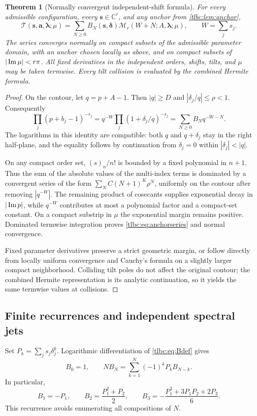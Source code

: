\documentclass[11pt,letterpaper]{article}
\numberwithin{equation}{section}
\newtheorem{theorem}{Theorem}[section]
\theoremstyle{definition}\newtheorem{definition}[theorem]{Definition}
\theoremstyle{remark}\newtheorem{remark}[theorem]{Remark}
\newcommand{\C}{\mathbb C}\newcommand{\R}{\mathbb R}\newcommand{\Q}{\mathbb Q}\newcommand{\Z}{\mathbb Z}
\newcommand{\M}{\mathcal M}\newcommand{\T}{\mathcal T}\newcommand{\K}{\mathcal K}
\newcommand{\bs}{\boldsymbol s}\newcommand{\ba}{\boldsymbol a}\newcommand{\bl}{\boldsymbol\lambda}
\newcommand{\bd}{\boldsymbol\delta}\newcommand{\bk}{\boldsymbol k}
\begin{document}
\begin{theorem}[Normally convergent independent-shift formula]\label{tlbc:thm:anchor}
For every admissible configuration, every $\bs\in\C^r$, and any anchor from \cref{tlbc:lem:anchor},
\begin{equation}\label{tlbc:eq:anchorseries}
 \boxed{\displaystyle
 \T(\bs,\ba,\bl;\mu)
 =\sum_{N\ge0}B_N(\bs,\bd)
       \M_r(W+N;A,\bl;\mu),\qquad W=\sum_js_j.}
\end{equation}
The series converges normally on compact subsets of the admissible parameter domain, with an anchor chosen locally as above, and on compact subsets of $|\operatorname{Im}\mu|<r\pi$. All fixed derivatives in the independent orders, shifts, tilts, and $\mu$ may be taken termwise. Every tilt collision is evaluated by the combined Hermite formula.
\end{theorem}
\begin{proof}
On the contour, let $q=p+A-1$. Then $|q|\ge D$ and
$|\delta_j/q|\le\rho<1$. Consequently
\[
 \prod_j(p+b_j-1)^{-s_j}
 =q^{-W}\prod_j(1+\delta_j/q)^{-s_j}
 =\sum_{N\ge0}B_Nq^{-W-N}.
\]
The logarithms in this identity are compatible: both $q$ and $q+\delta_j$ stay in the right half-plane, and the equality follows by continuation from $\delta_j=0$ within $|\delta_j|<|q|$.

On any compact order set, $(s)_n/n!$ is bounded by a fixed polynomial in $n+1$. Thus the sum of the absolute values of the multi-index terms is dominated by a convergent series of the form $\sum_N C(N+1)^K\rho^N$, uniformly on the contour after removing $|q^{-W}|$. The remaining product of cosecants supplies exponential decay in $|\operatorname{Im} p|$, while $q^{-W}$ contributes at most a polynomial factor and a compact-set constant. On a compact substrip in $\mu$ the exponential margin remains positive. Dominated termwise integration proves \eqref{tlbc:eq:anchorseries} and normal convergence.

Fixed parameter derivatives preserve a strict geometric margin, or follow directly from locally uniform convergence and Cauchy's formula on a slightly larger compact neighborhood. Colliding tilt poles do not affect the original contour; the combined Hermite representation is its analytic continuation, so it yields the same termwise values at collisions.
\end{proof}

\subsection{Finite recurrences and independent spectral jets}
Set $P_k=\sum_js_j\delta_j^k$. Logarithmic differentiation of \eqref{tlbc:eq:Bdef} gives
\begin{equation}\label{tlbc:eq:Brecurrence}
 B_0=1,\qquad
 NB_N=\sum_{k=1}^N(-1)^kP_kB_{N-k}.
\end{equation}
In particular,
\[
 B_1=-P_1,\qquad B_2=\frac{P_1^2+P_2}{2},\qquad
 B_3=-\frac{P_1^3+3P_1P_2+2P_3}{6}.
\]
This recurrence avoids enumerating all compositions of $N$.
\end{document}
